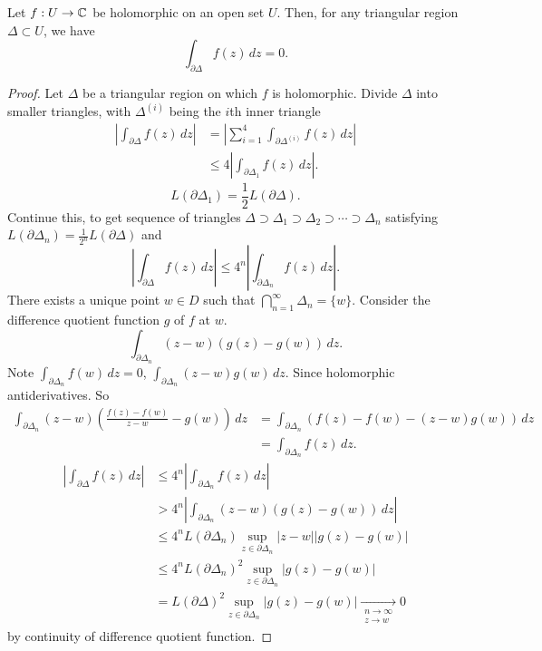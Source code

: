 \documentclass[10pt, a4paper]{article}
\begin{document}
\begin{lemma}
    Let $f : U \to \mathbb{C}$ be holomorphic on an open set $U$.
    Then,
    for any triangular region $\Delta \subset U$,
    we have
    \[
    \int_{\partial\Delta}f(z)\,dz = 0.
    \]

    \begin{proof}
        Let $\Delta$ be a triangular region on which $f$ is holomorphic.
        Divide $\Delta$ into smaller triangles,
        with $\Delta ^ {(i)}$ being the $i$th inner triangle
        \begin{align*}
            \left|\int_{\partial\Delta}f(z)\,dz\right| &= \left|\sum_{i = 1}^{4}\int_{\partial\Delta ^ {(i)}}f(z)\,dz\right| \\
            &\leq 4\left|\int_{\partial\Delta_1}f(z)\,dz\right|.
        \end{align*}
        \[
        L(\partial\Delta_1) = \frac{1}{2}L(\partial\Delta).
        \]
        Continue this,
        to get sequence of triangles $\Delta \supset \Delta_1 \supset \Delta_2 \supset \dotsi \supset \Delta_n$ satisfying $L(\partial\Delta_n) = \frac{1}{2 ^ n}L(\partial\Delta)$ and
        \[
        \left|\int_{\partial\Delta}f(z)\,dz\right| \leq 4 ^ n\left|\int_{\partial\Delta_n}f(z)\,dz\right|.
        \]
        There exists a unique point $w \in D$ such that $\bigcap_{n = 1}^{\infty}\Delta_n = \{w\}$.
        Consider the difference quotient function $g$ of $f$ at $w$.
        \[
        \int_{\partial\Delta_n}(z - w)(g(z) - g(w))\,dz.
        \]
        Note $\int_{\partial\Delta_n}f(w)\,dz = 0$,
        $\int_{\partial\Delta_n}(z - w)g(w)\,dz$.
        Since holomorphic antiderivatives.
        So
        \begin{align*}
            \int_{\partial\Delta_n}(z - w)\left(\frac{f(z) - f(w)}{z - w} - g(w)\right)\,dz &= \int_{\partial\Delta_n}(f(z) - f(w) - (z - w)g(w))\,dz \\
            &= \int_{\partial\Delta_n}f(z)\,dz.
        \end{align*}
        \begin{align*}
            \left|\int_{\partial\Delta}f(z)\,dz\right| &\leq 4 ^ n\left|\int_{\partial\Delta_n}f(z)\,dz\right| \\
            &> 4 ^ n\left|\int_{\partial\Delta_n}(z - w)(g(z) - g(w))\,dz\right| \\
            &\leq 4 ^ nL(\partial\Delta_n)\sup_{z \in \partial\Delta_n}|z - w||g(z) - g(w)| \\
            &\leq 4 ^ nL(\partial\Delta_n) ^ 2\sup_{z \in \partial\Delta_n}|g(z) - g(w)| \\
            &= L(\partial\Delta) ^ 2\sup_{z \in \partial\Delta_n}|g(z) - g(w)| \underset{\substack{n \to \infty \\ z \to w}}{\to} 0
        \end{align*}
        by continuity of difference quotient function.
    \end{proof}
\end{lemma}
\end{document}
